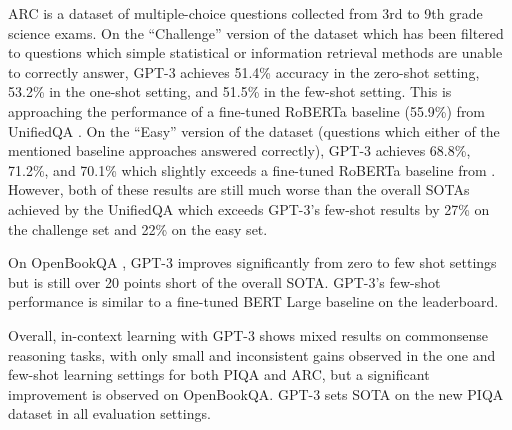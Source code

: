\documentclass{article}
\begin{document}
ARC \cite{Clark2018ThinkYH} is a dataset of multiple-choice questions collected from 3rd to 9th grade science exams. On the ``Challenge'' version of the dataset which has been filtered to questions which simple statistical or information retrieval methods are unable to  correctly answer, GPT-3 achieves 51.4\% accuracy in the zero-shot setting, 53.2\% in the one-shot setting, and 51.5\% in the few-shot setting. This is approaching the performance of a fine-tuned RoBERTa baseline (55.9\%) from UnifiedQA \cite{khashabi2020unifiedqa}. On the ``Easy'' version of the dataset (questions which either of the mentioned baseline approaches answered correctly), GPT-3 achieves 68.8\%, 71.2\%, and 70.1\% which slightly exceeds a fine-tuned RoBERTa baseline from \cite{khashabi2020unifiedqa}. However, both of these results are still much worse than the overall SOTAs achieved by the UnifiedQA which exceeds GPT-3’s few-shot results by 27\% on the challenge set and 22\% on the easy set.

On OpenBookQA \cite{Mihaylov2018CanAS}, GPT-3 improves significantly from zero to few shot settings but is still over 20 points short of the overall SOTA. GPT-3's few-shot performance is similar to a fine-tuned BERT Large baseline on the leaderboard.

Overall, in-context learning with GPT-3 shows mixed results on commonsense reasoning tasks, with only small and inconsistent gains observed in the one and few-shot learning settings for both PIQA and ARC, but a significant improvement is observed on OpenBookQA. GPT-3 sets SOTA on the new PIQA dataset in all evaluation settings.

     
\end{document}
